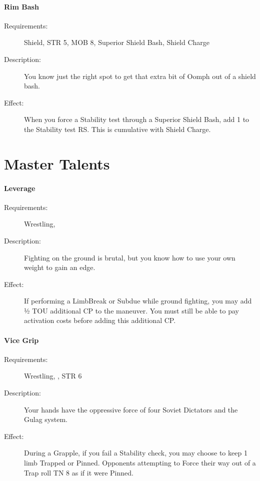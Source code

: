 \documentclass[oneside,11pt,english]{book}
\begin{document}
\paragraph{\label{talent:Rim Bash}Rim Bash}
\begin{description}
\item [Requirements:] Shield, STR 5, MOB 8, Superior Shield Bash, Shield Charge 
\item [Description:] You know just the right spot to get that extra bit of Oomph out of a shield bash. 
\item [Effect:] When you force a Stability test through a Superior Shield Bash, add 1 to the Stability test RS. 
  This is cumulative with Shield Charge. 
\end{description}
\section{Master Talents}\label{sec:Master Talents}

 \paragraph{Leverage}
 \begin{description}
 \item [ Requirements: ] Wrestling, 
 \item [ Description: ] Fighting on the ground is brutal, but you know how to
   use your own weight to gain an edge.
 \item [ Effect: ] If performing a Limb­Break or Subdue while ground fighting,
   you may add 1⁄2 TOU additional CP to the maneuver. You must still be able to
   pay activation costs before adding this additional CP.
 \end{description}

\paragraph{Vice Grip}
 \begin{description}
\item [ Requirements: ] Wrestling, , STR 6
\item [ Description: ] Your hands have the oppressive force of four Soviet
   Dictators and the Gulag system.
 \item [ Effect: ] During a Grapple, if you fail a Stability check, you may
   choose to keep 1 limb Trapped or Pinned. Opponents attempting to Force their
   way out of a Trap roll TN 8 as if it were Pinned.
 \end{description}
\end{document}

